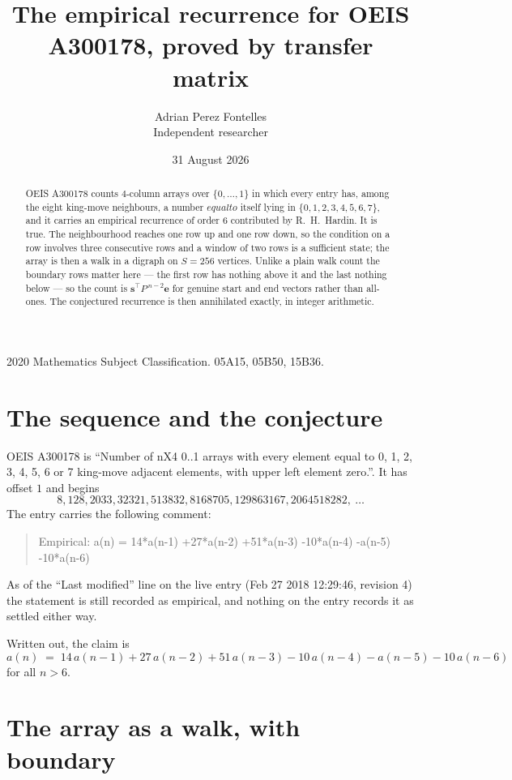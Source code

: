 \documentclass[11pt,a4paper]{article}
\title{The empirical recurrence for OEIS A300178, proved by transfer matrix}
\author{Adrian Perez Fontelles\\ \small Independent researcher}
\date{31 August 2026}
\theoremstyle{plain}
\theoremstyle{definition}
\begin{document}
\maketitle

\begin{abstract}
OEIS A300178 counts $4$-column arrays over $\{0,\dots,1\}$ in which every entry has,
among the eight king-move neighbours, a number $equal to$ itself lying in $\{0,1,2,3,4,5,6,7\}$, and it carries an empirical
recurrence of order $6$ contributed by R.~H.~Hardin. It is true. The neighbourhood
reaches one row up and one row down, so the condition on a row involves three consecutive
rows and a window of two rows is a sufficient state; the array is then a walk in a digraph
on $S=256$ vertices. Unlike a plain walk count the boundary rows matter here --- the first
row has nothing above it and the last nothing below --- so the count is
$\mathbf{s}^{\!\top}P^{\,n-2}\mathbf{e}$ for genuine start and end vectors rather than
all-ones. The conjectured recurrence is then annihilated exactly, in integer arithmetic.
\end{abstract}

\noindent\small 2020 Mathematics Subject Classification. 05A15, 05B50, 15B36.\normalsize

\section{The sequence and the conjecture}

OEIS A300178 is ``Number of nX4 0..1 arrays with every element equal to 0, 1, 2, 3, 4, 5, 6 or 7 king-move adjacent elements, with upper left element zero.''. It has offset
$1$ and begins
\[
8, 128, 2033, 32321, 513832, 8168705, 129863167, 2064518282,\ \dots
\]
The entry carries the following comment:
\begin{quote}\small
Empirical: a(n) = 14*a(n-1) +27*a(n-2) +51*a(n-3) -10*a(n-4) -a(n-5) -10*a(n-6)
\end{quote}
As of the ``Last modified'' line on the live entry (Feb 27 2018 12:29:46, revision
4) the statement is still recorded as empirical, and nothing on the entry
records it as settled either way.

Written out, the claim is
\begin{equation}\label{eq:conj}
a(n)\;=\;14\,a(n-1) + 27\,a(n-2) + 51\,a(n-3) - 10\,a(n-4) - a(n-5) - 10\,a(n-6)
\end{equation}
for all $n>6$.

\section{The array as a walk, with boundary}
\end{document}
